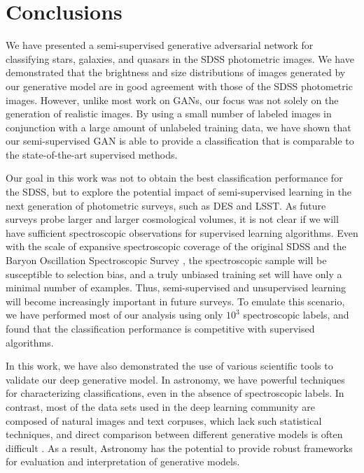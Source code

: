 \documentclass[fleqn,usenatbib]{mnras}
\begin{document}
\section{Conclusions}
  \label{sec:conclusions}

We have presented a semi-supervised generative adversarial network for classifying stars, galaxies, and quasars in the SDSS photometric images.
We have demonstrated that the brightness and size distributions of images generated by our generative model
are in good agreement with those of the SDSS photometric images.
However, unlike most work on GANs, our focus was not solely on the generation of realistic images.
By using a small number of labeled images in conjunction with a large amount of unlabeled training data,
we have shown that our semi-supervised GAN is able to provide a classification that is comparable to the state-of-the-art
supervised methods.

Our goal in this work was not to obtain the best classification performance for the SDSS,
but to explore the potential impact of semi-supervised learning in the next generation of photometric surveys, such as DES and LSST.
As future surveys probe larger and larger cosmological volumes, it is not clear if we will have sufficient spectroscopic observations
for supervised learning algorithms.
Even with the scale of expansive spectroscopic coverage of the original SDSS and the Baryon Oscillation Spectroscopic Survey
\citep[BOSS;][]{dawson2012baryon}, the spectroscopic sample will be susceptible to selection bias,
and a truly unbiased training set will have only a minimal number of examples.
Thus, semi-supervised and unsupervised learning will become increasingly important in future surveys.
To emulate this scenario, we have performed most of our analysis using only $10^3$ spectroscopic labels, and
found that the classification performance is competitive with supervised algorithms.

In this work, we have also demonstrated the use of various scientific tools to validate our deep generative model.
In astronomy, we have powerful techniques for characterizing classifications, even in the absence of spectroscopic labels.
In contrast, most of the data sets used in the deep learning community are composed of natural images and text corpuses,
which lack such statistical techniques,
and direct comparison between different generative models is often difficult 
\citep{theis2016note}.
As a result, Astronomy has the potential to provide robust frameworks for evaluation and interpretation of generative models.
\end{document}
